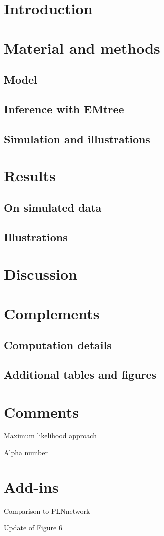 \section{Introduction}

%

\section{Material and methods}
\subsection{Model} \label{sec:model} 
\subsection{Inference with EMtree} \label{sec:inference} 
\subsection{Simulation and illustrations} 
 
\section{Results}
\subsection{On simulated data}  \label{sec:simul}
\subsection{Illustrations}  \label{sec:illustration}

\section{Discussion} 
\section{Complements}
 \subsection{Computation details}
 
 \subsection{Additional tables and figures}
 
 
\section{Comments}
Maximum likelihood approach

Alpha number


\section{Add-ins}
Comparison to PLNnetwork

Update of Figure 6